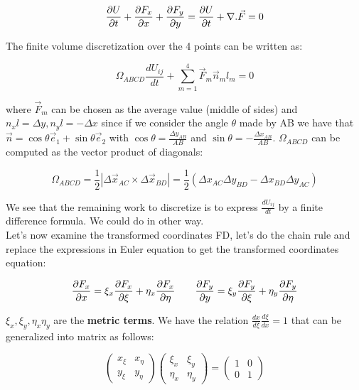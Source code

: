 \begin{equation}
\frac{\partial U}{\partial t} +\frac{\partial F_x}{\partial x} + \frac{\partial F_y}{\partial y} = \frac{\partial U}{\partial t } + \nabla .\vec{F} = 0
\end{equation}

The finite volume discretization over the 4 points can be written as: 

\begin{equation}
\Omega _{ABCD} \frac{dU_{ij}}{dt} + \sum_{m=1}^{4} \vec{F}_m\vec{n}_ml_m=0
\end{equation} 

where $\vec{F}_m$ can be chosen as the average value (middle of sides) and $n_x l = \Delta y, n_y l =  - \Delta x$ since if we consider the angle $\theta$ made by AB we have that $\vec{n} = \cos \theta \vec{e}_1 + \sin \theta \vec{e}_2$ with $\cos \theta = \frac{\Delta y_{AB}}{AB}$ and $\sin \theta = -\frac{\Delta x_{AB}}{AB}$. $\Omega _{ABCD}$ can be computed as the vector product of diagonals: 

\begin{equation}
\Omega _{ABCD} = \frac{1}{2}|\Delta \vec{x} _{AC} \times \Delta \vec{x}_{BD}| = \frac{1}{2} (\Delta x_{AC}\Delta y_{BD}-\Delta x_{BD}\Delta y_{AC})
\end{equation}

We see that the remaining work to discretize is to express $\frac{dU_{ij}}{dt}$ by a finite difference formula. We could do in other way. \\

Let's now examine the transformed coordinates FD, let's do the chain rule and replace the expressions in Euler equation to get the transformed coordinates equation: 

\begin{equation}
\frac{\partial F_x}{\partial x} = \xi _x\frac{\partial F_x}{\partial \xi} + \eta _x\frac{\partial F_x}{\partial \eta}\qquad \frac{\partial F_y}{\partial y} = \xi _y\frac{\partial F_y}{\partial \xi} + \eta _y\frac{\partial F_y}{\partial \eta}
\label{1.33}
\end{equation}

$\xi _x, \xi _y, \eta _x \eta _y$ are the \textbf{metric terms}. We have the relation $\frac{dx}{d\xi} \frac{d\xi}{dx} = 1$ that can be generalized into matrix as follows: 

\begin{equation}
\left( 
\begin{array}{cc}
x _\xi & x_\eta\\
y _\xi & y_\eta
\end{array}
\right)
\left( 
\begin{array}{cc}
\xi _x & \xi _y\\
\eta _x & \eta _y
\end{array}
\right)
=
\left( 
\begin{array}{cc}
1 & 0\\
0 & 1
\end{array}
\right)
\end{equation}


